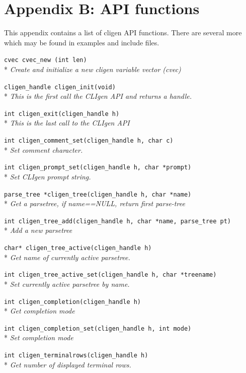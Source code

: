 \documentclass[a4paper, 10pt] {article}
\begin{document}
\newpage
\section*{Appendix B: API functions}
\label{app:functions}

This appendix contains a list of cligen API functions. There are several more which may be found in examples and include files.
\small

{\tt cvec cvec\-\_\-new (int len)}\\*
\emph{Create and initialize a new cligen variable vector (cvec)}

{\tt cligen\_handle cligen\_init(void)}\\*
\emph{This is the first call the CLIgen API and returns a handle. }

{\tt int cligen\_exit(cligen\_handle h)}\\*
\emph{ This is the last call to the CLIgen API}

{\tt int cligen\_comment\_set(cligen\_handle h, char c)}\\*
\emph{ Set comment character.}

{\tt int cligen\_prompt\_set(cligen\_handle h, char *prompt)}\\*
\emph{ Set CLIgen prompt string.}

{\tt parse\_tree *cligen\_tree(cligen\_handle h, char *name)}\\*
\emph{ Get a parsetree, if name==NULL, return first parse-tree}

{\tt int cligen\_tree\_add(cligen\_handle h, char *name, parse\_tree pt)}\\*
\emph{ Add a new parsetree}

{\tt char* cligen\_tree\_active(cligen\_handle h)}\\*
\emph{ Get name of currently active parsetree.}

{\tt int cligen\_tree\_active\_set(cligen\_handle h, char *treename)}\\*
\emph{ Set currently active parsetree by name.}

{\tt int cligen\_completion(cligen\_handle h)}\\*
\emph{ Get completion mode}

{\tt int cligen\_completion\_set(cligen\_handle h, int mode)}\\*
\emph{ Set completion mode}

{\tt int cligen\_terminalrows(cligen\_handle h)}\\*
\emph{ Get number of displayed terminal rows.}
\end{document}
